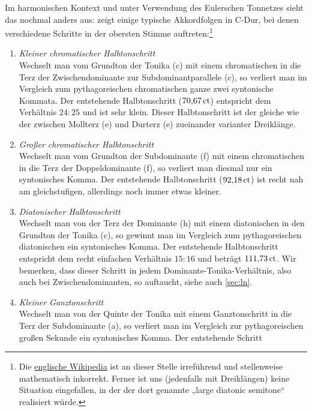 Im harmonischen Kontext und unter Verwendung des Eulerschen Tonnetzes sieht das
nochmal anders aus:  zeigt einige typische Akkordfolgen in
C-Dur, bei denen verschiedene Schritte in der obersten Stimme
auftreten:\footnote{Die
  \href{https://en.wikipedia.org/wiki/Semitone\#Just_intonation}{englische
    Wikipedia} ist an dieser Stelle irreführend und stellenweise mathematisch
  inkorrekt. Ferner ist uns (jedenfalls mit Dreiklängen) keine Situation
  eingefallen, in der der dort genannte „large diatonic semitone“ realisiert
  würde.}
\begin{enumerate}
\item \emph{Kleiner chromatischer Halbtonschritt}\\
  Wechselt man vom Grundton der Tonika (c) mit einem chromatischen  in
  die Terz der Zwischendominante zur Subdominantparallele (\sharpmm c), so
  verliert man im Vergleich zum pythagoreischen chromatischen  ganze
  zwei syntonische Kommata. Der entstehende Halbtonschritt ($70{,}67\,\text{ct}$)
  entspricht dem Verhältnis $24:25$ und ist sehr klein. Dieser Halbtonschritt
  ist der gleiche wie der zwischen Mollterz (\flatp e) und Durterz
  (\naturalm e) zueinander varianter Dreiklänge.
\item \emph{Großer chromatischer Halbtonschritt}\\
  Wechselt man vom Grundton der Subdominante (f) mit einem chromatischen
   in die Terz der Doppeldominante (\sharpm f), so verliert man diesmal
  nur ein syntonisches Komma.  Der entstehende Halbtonschritt
  ($92{,}18\,\mathrm{ct}$) ist recht nah am gleichstufigen, allerdings
  noch immer etwas kleiner.
\item \emph{Diatonischer Halbtonschritt}\\
  Wechselt man von der Terz der Dominante (\naturalm h) mit einem diatonischen
   in den Grundton der Tonika (c), so gewinnt man im Vergleich zum
  pythagoreischen diatonischen  ein syntonisches Komma.  Der
  entstehende Halbtonschritt entspricht dem recht einfachen Verhältnis $15:16$
  und beträgt $111{,}73\,\text{ct}$.  Wir bemerken, dass dieser Schritt in jedem
  Dominante-Tonika-Verhältnis, also auch bei Zwischendominanten, so auftaucht,
  siehe auch \cref{sec:ln}.
\item \emph{Kleiner Ganztonschritt}\\
  Wechselt man von der Quinte der Tonika mit einem Ganztonschritt in die Terz
  der Subdominante (\naturalm a), so verliert man im Vergleich zur
  pythagoreischen großen Sekunde ein syntonisches Komma. Der entstehende Schritt

\end{enumerate}
